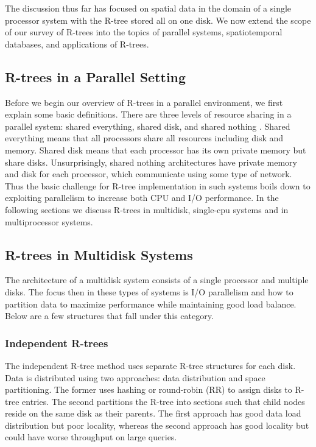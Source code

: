 The discussion thus far has focused on spatial data in the domain of a single
processor system with the R-tree stored all on one disk. We now extend the 
scope of our survey of R-trees into the topics of parallel systems, 
spatiotemporal databases, and applications of R-trees.

\subsection{R-trees in a Parallel Setting}
Before we begin our overview of R-trees in a parallel environment, we first 
explain some basic definitions. There are three levels of resource sharing in
a parallel system: shared everything, shared disk, and shared nothing
\cite{thebook}. Shared everything means that all processors share all 
resources including disk and memory. Shared disk means that each processor 
has its own private memory but share disks. Unsurprisingly, shared nothing 
architectures have private memory and disk for each processor, which
communicate using some type of network. Thus the basic challenge for R-tree 
implementation in such systems boils down to exploiting parallelism to 
increase both CPU and I/O performance. In the following sections we discuss
R-trees in multidisk, single-cpu systems and in multiprocessor systems.

\subsection{R-trees in Multidisk Systems}
The architecture of a multidisk system consists of a single processor and 
multiple disks. The focus then in these types of systems is I/O parallelism
and how to partition data to maximize performance while maintaining good load
balance. Below are a few structures that fall under this category.

\subsubsection{Independent R-trees}
The independent R-tree method \cite{kamel1992parallel}\cite{thebook} uses separate R-tree structures for each disk.
Data is distributed using two approaches: data distribution and space 
partitioning. The former uses hashing or round-robin (RR) to assign disks to
R-tree entries. The second partitions the R-tree into sections such that 
child nodes reside on the same disk as their parents. The first approach 
has good data load distribution but poor locality, whereas the second approach
has good locality but could have worse throughput on large queries.

